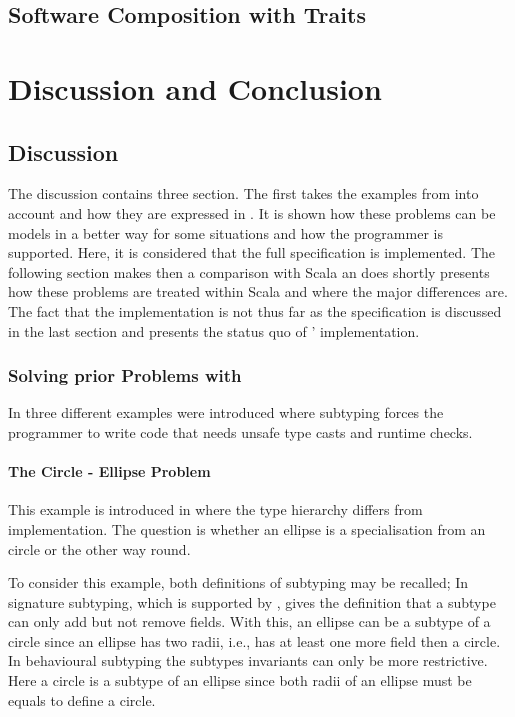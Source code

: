 \begin{lstlisting}[float,language=scala,caption=Abstract type declaration in Scala,label=lst:abstractType]

\end{lstlisting}

\section{Software Composition with Traits}


\chapter{Discussion and Conclusion}
\section{Discussion}
\label{ctr:discussion}
The discussion contains three section. The first takes the examples from
 into account and how they are expressed
in \ooplss. It is shown how these problems can be models in a better
way for some situations and how the programmer is supported. Here, it
is considered that the full specification is implemented. The following
section makes then a comparison with Scala an does shortly presents how
these problems are treated within Scala and where the major differences
are. The fact that the implementation is not thus far as the specification
is discussed in the last section and presents the status quo of \ooplss'
implementation.

\subsection{Solving prior Problems with \ooplss}
In  three different examples were
introduced where subtyping forces the programmer to write code that
needs unsafe type casts and runtime checks.

\subsubsection{The Circle - Ellipse Problem}
This example is introduced in  where the type
hierarchy differs from implementation. The question is whether an ellipse
is a specialisation from an circle or the other way round.

To consider this example, both definitions of subtyping may be recalled;
In signature subtyping, which is supported by \ooplss, gives the
definition that a subtype can only add but not remove fields. With this,
an ellipse can be a subtype of a circle since an ellipse has two radii,
i.e., has at least one more field then a circle. In behavioural subtyping
the subtypes invariants can only be more restrictive. Here a circle is
a subtype of an ellipse since both radii of an ellipse must be equals
to define a circle.

